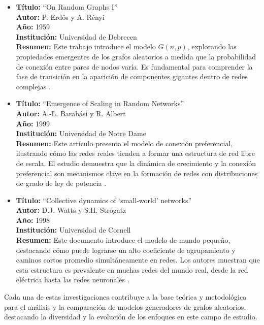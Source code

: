 \begin{itemize}
    \item \textbf{Título:} ``On Random Graphs I'' \\
    \textbf{Autor:} P. Erdős y A. Rényi \\
    \textbf{Año:} 1959 \\
    \textbf{Institución:} Universidad de Debrecen \\
    \textbf{Resumen:} Este trabajo introduce el modelo $G(n, p)$, explorando las propiedades emergentes de los grafos aleatorios a medida que la probabilidad de conexión entre pares de nodos varía. Es fundamental para comprender la fase de transición en la aparición de componentes gigantes dentro de redes complejas \citep{Erdos1959}.

    \item \textbf{Título:} ``Emergence of Scaling in Random Networks'' \\
    \textbf{Autor:} A.-L. Barabási y R. Albert \\
    \textbf{Año:} 1999 \\
    \textbf{Institución:} Universidad de Notre Dame \\
    \textbf{Resumen:} Este artículo presenta el modelo de conexión preferencial, ilustrando cómo las redes reales tienden a formar una estructura de red libre de escala. El estudio demuestra que la dinámica de crecimiento y la conexión preferencial son mecanismos clave en la formación de redes con distribuciones de grado de ley de potencia \citep{Barabasi1999}.

    \item \textbf{Título:} ``Collective dynamics of ‘small-world’ networks'' \\
    \textbf{Autor:} D.J. Watts y S.H. Strogatz \\
    \textbf{Año:} 1998 \\
    \textbf{Institución:} Universidad de Cornell \\
    \textbf{Resumen:} Este documento introduce el modelo de mundo pequeño, destacando cómo puede lograrse un alto coeficiente de agrupamiento y caminos cortos promedio simultáneamente en redes. Los autores muestran que esta estructura es prevalente en muchas redes del mundo real, desde la red eléctrica hasta las redes neuronales \citep{Watts1998}.
\end{itemize}

Cada una de estas investigaciones contribuye a la base teórica y metodológica para el análisis y la comparación de modelos generadores de grafos aleatorios, destacando la diversidad y la evolución de los enfoques en este campo de estudio.


